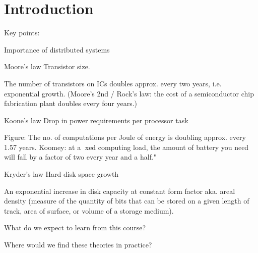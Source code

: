 \chapter{Introduction} \label{ch:introduction}


Key points:

    Importance of distributed systems 

    Moore's law
        Transistor size.

        The number of transistors on ICs doubles approx. every two years, i.e. exponential growth. (Moore's 2nd / Rock's law: the cost of a semiconductor chip fabrication plant doubles every four years.)

    Koone's law
        Drop in power requirements per processor task
        
        Figure: The no. of computations per Joule of energy is doubling approx. every 1.57 years. Koomey: at a xed computing load, the amount of battery you need will fall by a factor of two every year and a half."

    Kryder's law
        Hard disk space growth

        An exponential increase in disk capacity at constant form factor aka. areal density (measure of the quantity of bits that can be stored on a given length of track, area of surface, or volume of a storage medium).
    
    What do we expect to learn from this course?

    Where would we find these theories in practice?

